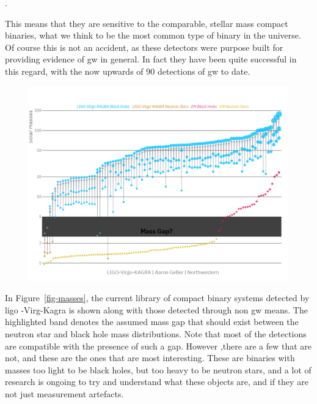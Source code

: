 \documentclass[
  10pt,
  a4paper,
  DIV=11,
  numbers=noendperiod,
  twoside]{scrreprt}
\let\[\relax \let\]\relax %
\DeclareRobustCommand{\[}{\begin{equation}}
\DeclareRobustCommand{\]}{\end{equation}}
\begin{document}
\[
.
\]

This means that they are sensitive to the comparable, stellar mass
 compact
binaries, what we think to be the most common type of binary in the
universe. Of course this is not an accident, as these detectors were
purpose built for providing evidence of \gls{gw} in general. In fact
they have been quite successful in this regard, with the now upwards of
90 detections of \gls{gw} to date.

\begin{figure}


{\centering \includegraphics{./Masses_of_Dead_Stars_LIGO_Virgo_KAGRA.png}

}

\end{figure}

In Figure~\ref{fig-masses}, the current library of compact binary
systems detected by \gls{ligo} -Virg-Kagra is shown along with those
detected through non \gls{gw} means. The highlighted band denotes the
assumed mass gap that should exist between the neutron star and black
hole mass distributions. Note that most of the detections are compatible
with the presence of such a gap. However ,there are a few that are not,
and these are the ones that are most interesting. These are binaries
with masses too light to be black holes, but too heavy to be neutron
stars, and a lot of research is ongoing to try and understand what these
objects are, and if they are not just measurement artefacts.
\end{document}
